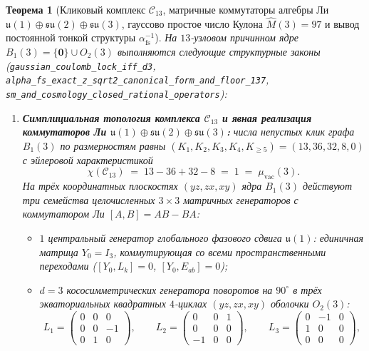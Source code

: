 \documentclass[11pt,a4paper]{article}
\theoremstyle{plain}
\newtheorem{theorem}{Теорема}[section]
\theoremstyle{definition}
\begin{document}
\begin{theorem}[Кликовый комплекс $\mathcal{C}_{13}$, матричные коммутаторы алгебры Ли $\mathfrak{u}(1)\oplus\mathfrak{su}(2)\oplus\mathfrak{su}(3)$, гауссово простое число Кулона $\widehat{M}(3)=97$ и вывод постоянной тонкой структуры $\alpha_{\mathrm{fs}}^{-1}$]
\label{thm:sm-alpha}
На $13$-узловом причинном ядре $B_1(3) = \{\mathbf{0}\}\cup O_2(3)$ выполняются следующие структурные законы (\texttt{gaussian\_coulomb\_lock\_iff\_d3}, \texttt{alpha\_fs\_exact\_z\_sqrt2\_canonical\_form\_and\_floor\_137}, \texttt{sm\_and\_cosmology\_closed\_rational\_operators}):
\begin{enumerate}[label=\textbf{(\arabic*)},leftmargin=*]
\item \textbf{Симплициальная топология комплекса $\mathcal{C}_{13}$ и явная реализация коммутаторов Ли $\mathfrak{u}(1)\oplus\mathfrak{su}(2)\oplus\mathfrak{su}(3)$:}
  числа непустых клик графа $B_1(3)$ по размерностям равны $(K_1, K_2, K_3, K_4, K_{\ge 5}) = (13, 36, 32, 8, 0)$ с эйлеровой характеристикой
  \begin{equation}
    \label{eq:c13-euler-char}
    \chi(\mathcal{C}_{13}) \;=\; 13 - 36 + 32 - 8 \;=\; 1 \;=\; \mu_{\mathrm{vac}}(3).
  \end{equation}
  На трёх координатных плоскостях $(yz, zx, xy)$ ядра $B_1(3)$ действуют три семейства целочисленных $3\times 3$ матричных генераторов с коммутатором Ли $[A, B] = AB - BA$:
  \begin{itemize}[leftmargin=*]
  \item $1$ центральный генератор глобального фазового сдвига $\mathfrak{u}(1)$: единичная матрица $Y_0 = I_3$, коммутирующая со всеми пространственными переходами ($[Y_0, L_k] = 0$, $[Y_0, E_{ab}] = 0$);
  \item $d = 3$ кососимметрических генератора поворотов на $90^\circ$ в трёх экваториальных квадратных $4$-циклах $(yz, zx, xy)$ оболочки $O_2(3)$:
    \begin{equation}
      \label{eq:su2-generators-matrices}
      L_1 = \begin{pmatrix} 0 & 0 & 0 \\ 0 & 0 & -1 \\ 0 & 1 & 0 \end{pmatrix}, \qquad
      L_2 = \begin{pmatrix} 0 & 0 & 1 \\ 0 & 0 & 0 \\ -1 & 0 & 0 \end{pmatrix}, \qquad
      L_3 = \begin{pmatrix} 0 & -1 & 0 \\ 1 & 0 & 0 \\ 0 & 0 & 0 \end{pmatrix},

\end{equation}
\end{itemize}
\end{enumerate}
\end{theorem}
\end{document}
